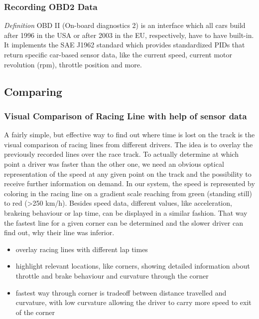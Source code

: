 \subsubsection{Recording OBD2 Data}
\textit{Definition} OBD II (On-board diagnostics 2) is an interface which all cars build after 1996 in the USA or after 2003 in the EU, respectively, have to have built-in. It implements the SAE J1962 standard which provides standardized PIDs that return specific car-based sensor data, like the current speed, current motor revolution (rpm), throttle position and more.

\subsection{Comparing}
\subsubsection{Visual Comparison of Racing Line with help of sensor data}
A fairly simple, but effective way to find out where time is lost on the track is the visual comparison of racing lines from different drivers. The idea is to overlay the previously recorded lines over the race track. To actually determine at which point a driver was faster than the other one, we need an obvious optical representation of the speed at any given point on the track and the possibility to receive further information on demand.
In our system, the speed is represented by coloring in the racing line on a gradient scale reaching from green (standing still) to red (>250 km/h).
Besides speed data, different values, like acceleration, brakeing behaviour or lap time, can be displayed in a similar fashion. That way the fastest line for a given corner can be determined and the slower driver can find out, why their line was inferior.

\begin{itemize}
  \item overlay racing lines with different lap times
  \item highlight relevant locations, like corners, showing detailed information about throttle and brake behaviour and curvature through the corner
  \item fastest way through corner is tradeoff between distance travelled and curvature, with low curvature allowing the driver to carry more speed to exit of the corner
\end{itemize}

